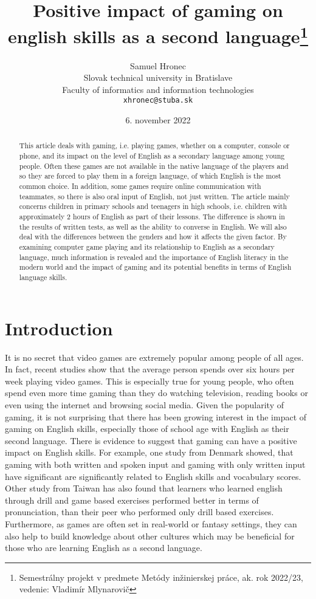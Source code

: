 \documentclass[10pt,twoside,english,a4paper]{article}
\title{Positive impact of gaming on english skills as a second language\thanks{Semestrálny projekt v predmete Metódy inžinierskej práce, ak. rok 2022/23, vedenie: Vladimír Mlynarovič}} %
\author{Samuel Hronec\\[2pt]
	{\small Slovak technical university in Bratislave}\\
	{\small Faculty of informatics and information technologies}\\
	{\small \texttt{xhronec@stuba.sk}}
	}
\date{\small 6. november 2022} %
\begin{document}
\maketitle

\begin{abstract}
This article deals with gaming, i.e. playing games, whether on a computer, console or phone, and its impact on the level of English as a secondary language among young people. Often these games are not available in the native language of the players and so they are forced to play them in a foreign language, of which English is the most common choice. In addition, some games require online communication with teammates, so there is also oral input of English, not just written. The article mainly concerns children in primary schools and teenagers in high schools, i.e. children with approximately 2 hours of English as part of their lessons. The difference is shown in the results of written tests, as well as the ability to converse in English. We will also deal with the differences between the genders and how it affects the given factor. By examining computer game playing and its relationship to English as a secondary language, much information is revealed and the importance of English literacy in the modern world and the impact of gaming and its potential benefits in terms of English language skills.
\end{abstract}



\section{Introduction}

It is no secret that video games are extremely popular among people of all ages. In fact, recent studies show that the average person spends over six hours per week playing video games. This is especially true for young people, who often spend even more time gaming than they do watching television, reading books or even using the internet and browsing social media. Given the popularity of gaming, it is not surprising that there has been growing interest in the impact of gaming on English skills, especially those of school age with English as their second language.
There is evidence to suggest that gaming can have a positive impact on English skills. For example, one study from Denmark \cite{Denmark_study} showed, that gaming with both written and spoken input and gaming with only written input have significant are significantly related to English skills and vocabulary scores. Other study from Taiwan \cite{Taiwan_study} has also found that learners who learned english through drill and game based exercises performed better in terms of pronunciation, than their peer who performed only drill based exercises. Furthermore, as games are often set in real-world or fantasy settings, they can also help to build knowledge about other cultures which may be beneficial for those who are learning English as a second language.
\end{document}

